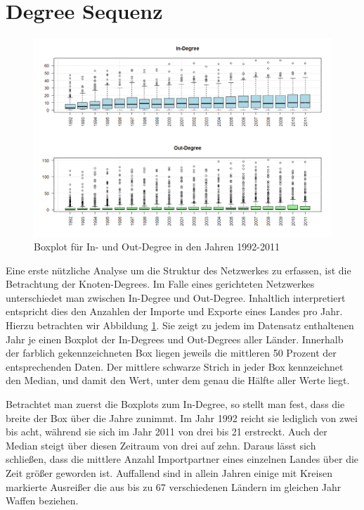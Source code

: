 \documentclass[a4paper,ngerman,oneside,titlepage,bibliography=totoc,11pt]{scrreprt}
\begin{document}
\section{Degree Sequenz}

\label{sec:degree}
\begin{figure}[ht]
	\centering
		\includegraphics[width=1.00\textwidth]{Grafiken/ts_degree.png}
	\caption{Boxplot für In- und Out-Degree in den Jahren 1992-2011}
	\label{fig:ts_degree}
\end{figure}

Eine erste nützliche Analyse um die Struktur des Netzwerkes zu erfassen, ist die Betrachtung der Knoten-Degrees. Im Falle eines gerichteten Netzwerkes unterschiedet man zwischen In-Degree und Out-Degree. Inhaltlich interpretiert entspricht dies den Anzahlen der Importe und Exporte eines Landes pro Jahr. Hierzu betrachten wir Abbildung \ref{fig:ts_degree}. Sie zeigt zu jedem im Datensatz enthaltenen Jahr je einen Boxplot der In-Degrees und Out-Degrees aller Länder. Innerhalb der farblich gekennzeichneten Box liegen jeweils die mittleren 50 Prozent der entsprechenden Daten. Der mittlere schwarze Strich in jeder Box kennzeichnet den Median, und damit den Wert, unter dem genau die Hälfte aller Werte liegt.

Betrachtet man zuerst die Boxplots zum In-Degree, so stellt man fest, dass die breite der Box über die Jahre zunimmt. Im Jahr 1992 reicht sie lediglich von zwei bis acht, während sie sich im Jahr 2011 von drei bis 21 erstreckt. Auch der Median steigt über diesen Zeitraum von drei auf zehn. Daraus lässt sich schließen, dass die mittlere Anzahl Importpartner eines einzelnen Landes über die Zeit größer geworden ist. Auffallend sind in allein Jahren einige mit Kreisen markierte Ausreißer
die aus bis zu 67 verschiedenen Ländern im gleichen Jahr Waffen beziehen.
\end{document}
